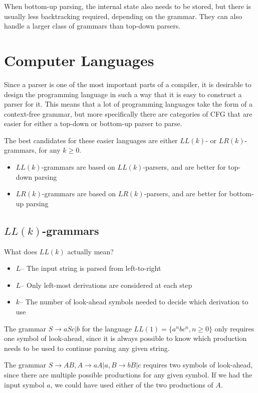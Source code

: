 When bottom-up parsing, the internal state also needs to be stored, but there is usually less backtracking required,
 depending on the grammar. They can also handle a larger class of grammars than top-down parsers.

\section*{Computer Languages}

Since a parser is one of the most important parts of a compiler, it is desirable to design the programming language in
 such a way that it is easy to construct a parser for it. This means that a lot of programming languages take the form
 of a context-free grammar, but more specifically there are categories of CFG that are easier for either a top-down or
 bottom-up parser to parse.

The best candidates for these easier languages are either $LL(k)$- or $LR(k)$-grammars, for any $k \geq 0$.
\begin{itemize}
  \item $LL(k)$-grammars are based on $LL(k)$-parsers, and are better for top-down parsing
  \item $LR(k)$-grammars are based on $LR(k)$-parsers, and are better for bottom-up parsing
\end{itemize}

\subsection*{$LL(k)$-grammars}

What does $LL(k)$ actually mean?
\begin{itemize}
  \item $L$-- The input string is parsed from left-to-right
  \item $L$-- Only left-most derivations are considered at each step
  \item $k$-- The number of look-ahead symbols needed to decide which derivation to use
\end{itemize}

\begin{example*}{}{}
  The grammar $S \rightarrow aSc | b$ for the language $LL(1) = \{{a^n}b{c^n}, n \geq 0\}$ only requires one symbol of
   look-ahead, since it is always possible to know which production needs to be used to continue parsing any given
   string.
\end{example*}

\begin{example*}{}{}
  The grammar $S \rightarrow AB, A \rightarrow aA | a, B \rightarrow bB | c$ requires two symbols of look-ahead, since
   there are multiple possible productions for any given symbol. If we had the input symbol $a$, we could have used
   either of the two productions of $A$.
\end{example*}

